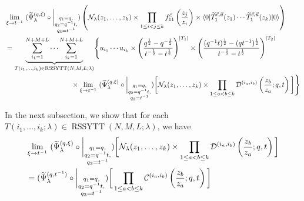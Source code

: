 \documentclass[12pt,reqno,a4paper]{amsart}
\newcommand{\comp}{\circ}
\newcommand{\cals}[1]{\mathcal{#1}}
\numberwithin{equation}{section}
\newcommand{\dualmap}{
\widetilde{\Psi}^{(q,\xi)}_{\lambda}
}
\theoremstyle{definition}
\begin{document}
\footnotesize
\begin{align}
	&
	\lim_{\xi \rightarrow t^{-1}}\,\,
	(
	\dualmap
	\comp 
	\bigg|_{
		\substack{
			q_1 = q, \\
			q_2 = q^{-1}t,\\
			q_3 = t^{-1} \\
		}
	}
	)
	\left(
	\cals{N}_{\lambda}(z_1,\dots,z_k )
	\times
	\prod_{1 \leq i < j \leq k}f^{\vec{c}}_{11}\left(\frac{z_j}{z_i} \right)
	\times
	\langle 0 |\widetilde{T}^{\vec{c},\vec{u}}_{1}(z_1 )\cdots \widetilde{T}^{\vec{c},\vec{u}}_{1}(z_k )|0\rangle
	\right)
	\label{eqn-a38-1102-1aug}
	\\
	&= 
	\underbrace{				
		\sum_{i_1 = 1}^{N+M+L}
		\cdots
		\sum_{i_k = 1}^{N+M+L}
	}_{
		T(i_1,\dots,i_k) \in 
		\operatorname{RSSYTT}(N,M,L;\lambda)
	}
	\Biggl\{
	u_{i_1}\cdots u_{i_k}
	\times
	\left(
	\frac{
		q^{\frac{1}{2}} - q^{-\frac{1}{2}}
	}{
		t^{-\frac{1}{2}} - t^{\frac{1}{2}}
	}
	\right)^{|T_1|}
	\times
	\left(
	\frac{
		(q^{-1}t)^{\frac{1}{2}} - (qt^{-1})^{\frac{1}{2}}
	}{
		t^{-\frac{1}{2}} - t^{\frac{1}{2}}
	}
	\right)^{|T_2|}
	\notag 
	\\
	&\hspace{3.3cm}\times
	\lim_{\xi \rightarrow t^{-1}}\,\,
	(
	\dualmap
	\comp 
	\bigg|_{
		\substack{
			q_1 = q, \\
			q_2 = q^{-1}t,\\
			q_3 = t^{-1} \\
		}
	}
	)
	\bigg[
	\cals{N}_\lambda(z_1,\dots,z_k)
	\times
	\prod_{1 \leq a < b \leq k}
	\cals{D}^{(i_a,i_b)}\left(
	\frac{z_b}{z_a}
	; q, t
	\right)
	\bigg]
	\Biggr\}
	\notag 
\end{align}
\normalsize

In the next subsection, we show that for each $T(i_1,\dots,i_k;\lambda) \in 
\operatorname{RSSYTT}(N,M,L;\lambda)$, we have 
\footnotesize
\begin{align}
	&\lim_{\xi \rightarrow t^{-1}}\,\,
	(
	\dualmap
	\comp 
	\bigg|_{
		\substack{
			q_1 = q, \\
			q_2 = q^{-1}t,\\
			q_3 = t^{-1} \\
		}
	}
	)
	\bigg[
	\cals{N}_\lambda(z_1,\dots,z_k)
	\times
	\prod_{1 \leq a < b \leq k}
	\cals{D}^{(i_a,i_b)}\left(
	\frac{z_b}{z_a}
	; q, t
	\right)
	\bigg]
	\label{a39-31jul-1751}
	\\
	&= 
	(
	\widetilde{\Psi}_{\lambda}^{(q,t^{-1})}
	\comp 
	\bigg|_{
		\substack{
			q_1 = q, \\
			q_2 = q^{-1}t,\\
			q_3 = t^{-1} \\
		}
	}
	)
	\bigg[
	\prod_{1 \leq a < b \leq k}
	\cals{C}^{(i_a,i_b)}\left(
	\frac{z_b}{z_a}
	; q, t
	\right)
	\bigg]
	\notag 
\end{align}
\normalsize
\end{document}
